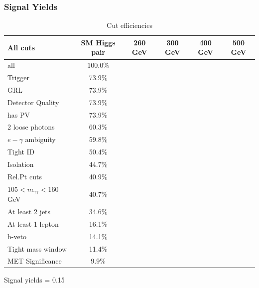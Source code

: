 \documentclass[preprint,review,16px]{beamer}
\begin{document}
\begin{frame}%
\vspace{3mm}
\frametitle{Signal Yields}

\begin{table}[!ht]
\tiny
\begin{center}
\begin{tabular}{l|ccccc}
\hline
All cuts                        & SM Higgs pair   &260 GeV &300 GeV &400 GeV &500 GeV \\
\hline
all                             & 100.0\%  &&&&\\
Trigger                         & 73.9\%   &&&&\\
GRL                             & 73.9\%   &&&&\\
Detector Quality                & 73.9\%   &&&&\\
has PV                          & 73.9\%   &&&&\\
2 loose photons                 & 60.3\%   &&&&\\
$e-\gamma$ ambiguity            & 59.8\%   &&&&\\
Tight ID                        & 50.4\%   &&&&\\
Isolation                       & 44.7\%   &&&&\\
Rel.Pt cuts                     & 40.9\%   &&&&\\
$105<m_{\gamma\gamma}<160$ GeV  & 40.7\%   &&&&\\
At least 2 jets                 & 34.6\%   &&&&\\
At least 1 lepton               & 16.1\%   &&&&\\
b-veto                          & 14.1\%   &&&&\\
Tight mass window               & 11.4\%   &&&&\\
MET Significance                & 9.9\%    &&&&\\

\hline
\end{tabular}
\caption{Cut efficiencies}
\label{tab:eventselection}
\end{center}
\end{table}

Signal yields = 0.15

\vspace{3mm}
\end{frame}
\end{document}
